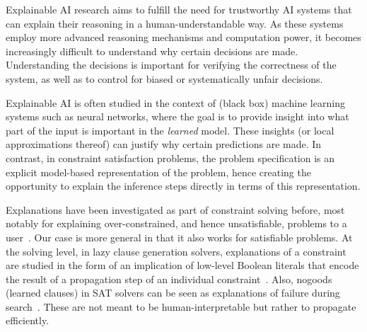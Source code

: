 


Explainable AI research aims to fulfill the need for trustworthy AI systems that can explain their reasoning in a human-understandable way. 
As these systems employ more advanced reasoning mechanisms and computation power, it becomes increasingly difficult to understand why certain decisions are made. 
Understanding the decisions is important for verifying the correctness of the system, as well as to control for biased or systematically unfair decisions.

Explainable AI is often studied in the context of (black box) machine learning systems such as neural networks, where the goal is to provide insight into what part of the input is important in the \textit{learned} model. These insights (or local approximations thereof) can justify why certain predictions are made. In contrast, in constraint satisfaction problems, the problem specification is an explicit model-based representation of the problem, hence creating the opportunity to explain the inference steps directly in terms of this representation.

Explanations have been investigated as part of constraint solving before, most notably for explaining over-constrained, and hence unsatisfiable, problems to a user~\cite{junker2001quickxplain}. Our case is more general in that it also works for satisfiable problems. At the solving level, in lazy clause generation solvers, explanations of a constraint are studied in the form of an implication of low-level Boolean literals that encode the result of a propagation step of an individual constraint~\cite{feydy2009lazy}. Also, nogoods (learned clauses) in SAT solvers can be seen as explanations of failure during search~\cite{marques2009conflict}. These are not meant to be human-interpretable but rather to propagate efficiently.


